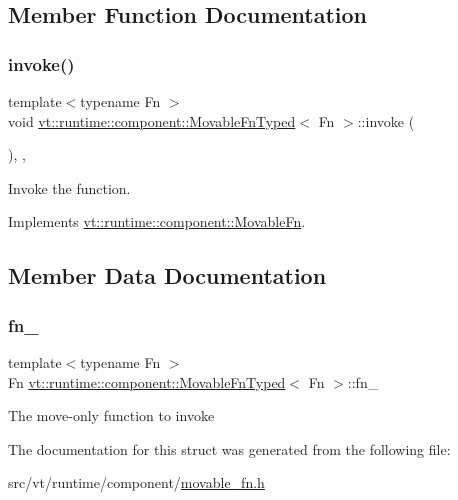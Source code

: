 \subsection{Member Function Documentation}
\mbox{\label{structvt_1_1runtime_1_1component_1_1_movable_fn_typed_a3b858f98fdfd58d9a812fa23138fd513}} 
\subsubsection{\texorpdfstring{invoke()}{invoke()}}
{\footnotesize\ttfamily template$<$typename Fn $>$ \\
void \hyperlink{structvt_1_1runtime_1_1component_1_1_movable_fn_typed}{vt\+::runtime\+::component\+::\+Movable\+Fn\+Typed}$<$ Fn $>$\+::invoke (\begin{DoxyParamCaption}{ }\end{DoxyParamCaption})\hspace{0.3cm}{\ttfamily [inline]}, {\ttfamily [override]}, {\ttfamily [virtual]}}



Invoke the function. 



Implements \hyperlink{structvt_1_1runtime_1_1component_1_1_movable_fn_a3dc1fa79ff75471bcee31b5b25bd0d2a}{vt\+::runtime\+::component\+::\+Movable\+Fn}.



\subsection{Member Data Documentation}
\mbox{\label{structvt_1_1runtime_1_1component_1_1_movable_fn_typed_ab50b89fe32be55d56b2375e4e9b14df5}} 
\subsubsection{\texorpdfstring{fn\+\_\+}{fn\_}}
{\footnotesize\ttfamily template$<$typename Fn $>$ \\
Fn \hyperlink{structvt_1_1runtime_1_1component_1_1_movable_fn_typed}{vt\+::runtime\+::component\+::\+Movable\+Fn\+Typed}$<$ Fn $>$\+::fn\+\_\+\hspace{0.3cm}{\ttfamily [private]}}

The move-\/only function to invoke 

The documentation for this struct was generated from the following file\+:\begin{DoxyCompactItemize}
\item 
src/vt/runtime/component/\hyperlink{movable__fn_8h}{movable\+\_\+fn.\+h}\end{DoxyCompactItemize}

